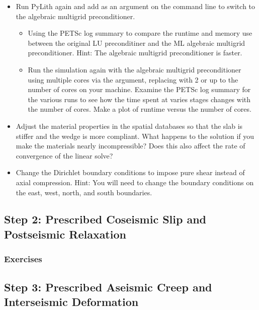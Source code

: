 \begin{itemize}
\item Run PyLith again and add
   as an argument on the
  command line to switch to the
  algebraic multigrid preconditioner.
  \begin{itemize}
  \item Using the PETSc log summary to compare the runtime and
    memory use between the original LU preconditiner and the ML
    algebraic multigrid preconditioner. Hint: The algebraic
    multigrid preconditioner is faster.
  \item Run the simulation again with the algebraic multigrid
    preconditioner using multiple cores via the
     argument, replacing
     with 2 or up to the number of cores on your
    machine. Examine the PETSc log summary for the various runs to
    see how the time spent at varies stages changes with the number
    of cores. Make a plot of runtime versus the number of
    cores.
  \end{itemize}
\item Adjust the material properties in the spatial databases so that the slab is stiffer and
  the wedge is more compliant. What happens to the solution if you make the
  materials nearly incompressible? Does this also affect the rate of
  convergence of the linear solve?
\item Change the Dirichlet boundary conditions to impose pure shear
  instead of axial compression. Hint: You will need to change the
  boundary conditions on the east, west, north, and south
  boundaries.
\end{itemize}
    

\subsection{Step 2: Prescribed Coseismic Slip and Postseismic Relaxation}

\subsubsection{Exercises}


\subsection{Step 3: Prescribed Aseismic Creep and Interseismic Deformation}

